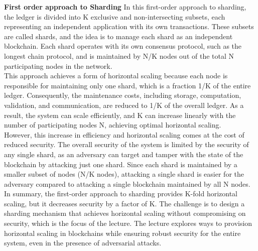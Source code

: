 \documentclass{report}
\begin{document}
\textbf{First order approach to Sharding} In this first-order approach to sharding, the ledger is divided into K exclusive and non-intersecting subsets, each representing an independent application with its own transactions. These subsets are called shards, and the idea is to manage each shard as an independent blockchain. Each shard operates with its own consensus protocol, such as the longest chain protocol, and is maintained by N/K nodes out of the total N participating nodes in the network.\\
This approach achieves a form of horizontal scaling because each node is responsible for maintaining only one shard, which is a fraction 1/K of the entire ledger. Consequently, the maintenance costs, including storage, computation, validation, and communication, are reduced to 1/K of the overall ledger. As a result, the system can scale efficiently, and K can increase linearly with the number of participating nodes N, achieving optimal horizontal scaling.\\
However, this increase in efficiency and horizontal scaling comes at the cost of reduced security. The overall security of the system is limited by the security of any single shard, as an adversary can target and tamper with the state of the blockchain by attacking just one shard. Since each shard is maintained by a smaller subset of nodes (N/K nodes), attacking a single shard is easier for the adversary compared to attacking a single blockchain maintained by all N nodes.\\
In summary, the first-order approach to sharding provides K-fold horizontal scaling, but it decreases security by a factor of K. The challenge is to design a sharding mechanism that achieves horizontal scaling without compromising on security, which is the focus of the lecture. The lecture explores ways to provision horizontal scaling in blockchains while ensuring robust security for the entire system, even in the presence of adversarial attacks.
\end{document}
